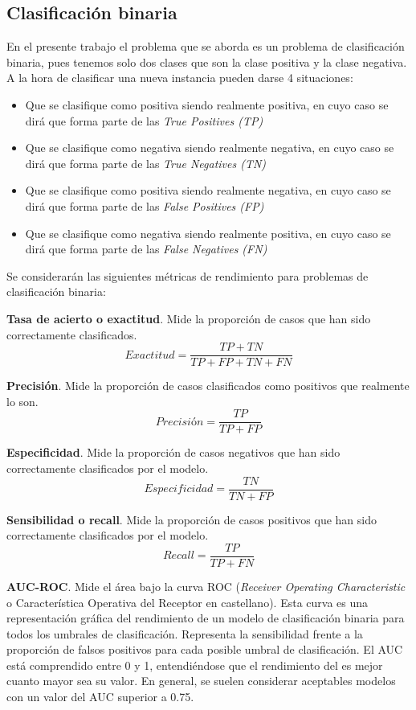 \documentclass[12pt,a4paper,]{book}
\numberwithin{dummy}{section}
\theoremstyle{ocrenumbox}
\theoremstyle{blacknumex}
\theoremstyle{blacknumbox}
\theoremstyle{ocrenum}
\theoremstyle{ocrenum}
\begin{document}
\hypertarget{clasificaciuxf3n-binaria}{%
\subsection{Clasificación binaria}\label{clasificaciuxf3n-binaria}}

En el presente trabajo el problema que se aborda es un problema de
clasificación binaria, pues tenemos solo dos clases que son la clase
positiva y la clase negativa. A la hora de clasificar una nueva
instancia pueden darse 4 situaciones:

\begin{itemize}
\item
  Que se clasifique como positiva siendo realmente positiva, en cuyo
  caso se dirá que forma parte de las \emph{True Positives (TP)}
\item
  Que se clasifique como negativa siendo realmente negativa, en cuyo
  caso se dirá que forma parte de las \emph{True Negatives (TN)}
\item
  Que se clasifique como positiva siendo realmente negativa, en cuyo
  caso se dirá que forma parte de las \emph{False Positives (FP)}
\item
  Que se clasifique como negativa siendo realmente positiva, en cuyo
  caso se dirá que forma parte de las \emph{False Negatives (FN)}
\end{itemize}

Se considerarán las siguientes métricas de rendimiento para problemas de
clasificación binaria:

\textbf{Tasa de acierto o exactitud}. Mide la proporción de casos que
han sido correctamente clasificados.
\[Exactitud = \frac{TP + TN}{TP + FP + TN + FN}\]

\textbf{Precisión}. Mide la proporción de casos clasificados como
positivos que realmente lo son. \[ Precisión = \frac{TP}{TP + FP}\]

\textbf{Especificidad}. Mide la proporción de casos negativos que han
sido correctamente clasificados por el modelo.
\[ Especificidad = \frac{TN}{TN + FP}\]

\textbf{Sensibilidad o recall}. Mide la proporción de casos positivos
que han sido correctamente clasificados por el modelo.
\[ Recall = \frac{TP}{TP + FN}\]

\textbf{AUC-ROC}. Mide el área bajo la curva ROC (\emph{Receiver
Operating Characteristic} o Característica Operativa del Receptor en
castellano). Esta curva es una representación gráfica del rendimiento de
un modelo de clasificación binaria para todos los umbrales de
clasificación. Representa la sensibilidad frente a la proporción de
falsos positivos para cada posible umbral de clasificación. El AUC está
comprendido entre 0 y 1, entendiéndose que el rendimiento del es mejor
cuanto mayor sea su valor. En general, se suelen considerar aceptables
modelos con un valor del AUC superior a 0.75.
\end{document}
